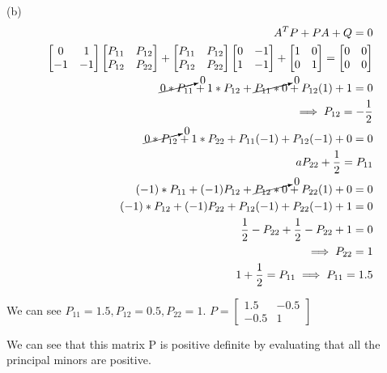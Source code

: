 \documentclass{article}
\begin{document}
  (b)
  \begin{align*}
    A^TP + PA + Q = 0 \\
    \begin{bmatrix}
      0 & 1 \\
      -1 &-1
    \end{bmatrix}
    \begin{bmatrix}
      P_{11} & P_{12} \\
      P_{12} & P_{22}
    \end{bmatrix} +
    \begin{bmatrix}
      P_{11} & P_{12} \\
      P_{12} & P_{22}
    \end{bmatrix}
    \begin{bmatrix}
      0 & -1 \\
      1 &-1
    \end{bmatrix}+
    \begin{bmatrix}
      1 & 0 \\
      0 & 1
    \end{bmatrix} =
    \begin{bmatrix}
      0 & 0 \\
      0 & 0
    \end{bmatrix} \\
    \cancelto{0}{0*P_{11}}+1*P_{12} + \cancelto{0}{P_{11}*0}+P_{12}(1) + 1 = 0 \\
    \implies P_{12} = -\frac{1}{2} \\
    \cancelto{0}{0*P_{12}}+1*P_{22} + P_{11}(-1)+P_{12}(-1) + 0 = 0 \\a
    P_{22}+\frac{1}{2} = P_{11} \\
    (-1)*P_{11}+(-1)P_{12} + \cancelto{0}{P_{12}*0}+P_{22}(1) + 0 = 0 \\
    (-1)*P_{12}+(-1)P_{22} + P_{12}(-1)+P_{22}(-1) + 1 = 0\\
    \frac{1}{2}-P_{22} + \frac{1}{2} - P_{22} + 1 = 0 \\
    \implies P_{22}=1 \\
    1+\frac{1}{2} = P_{11} \implies P_{11} = 1.5
  \end{align*}

  We can see $P_{11}=1.5, P_{12}=0.5, P_{22}=1$.
  $P=\begin{bmatrix}
       1.5 & -0.5 \\
       -0.5 & 1
     \end{bmatrix}$

  We can see that this matrix P is positive definite by evaluating that all the
  principal minors are positive.

   

    
 
\end{document}
